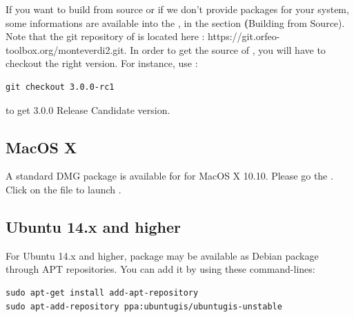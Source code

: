 If you want to build from source or if we don't provide packages for your system, some informations are available into the \sg, in the section \textbf(Building from Source).
Note that the git repository of \mont is located here : https://git.orfeo-toolbox.org/monteverdi2.git.
In order to get the source of \mont, you will have to checkout the right version. For instance, use : 
\begin{verbatim}
git checkout 3.0.0-rc1
\end{verbatim}
to get 3.0.0 Release Candidate version.



\subsection{MacOS X}
A standard DMG package is available for \mont for MacOS X 10.10. Please go the \download.
Click on the file to launch \mont. 

\subsection{Ubuntu 14.x and higher}
For Ubuntu 14.x and higher, \mont package may be available as Debian package through APT repositories.
You can add it by using these command-lines:
\begin{verbatim}
sudo apt-get install add-apt-repository
sudo apt-add-repository ppa:ubuntugis/ubuntugis-unstable
\end{verbatim}

